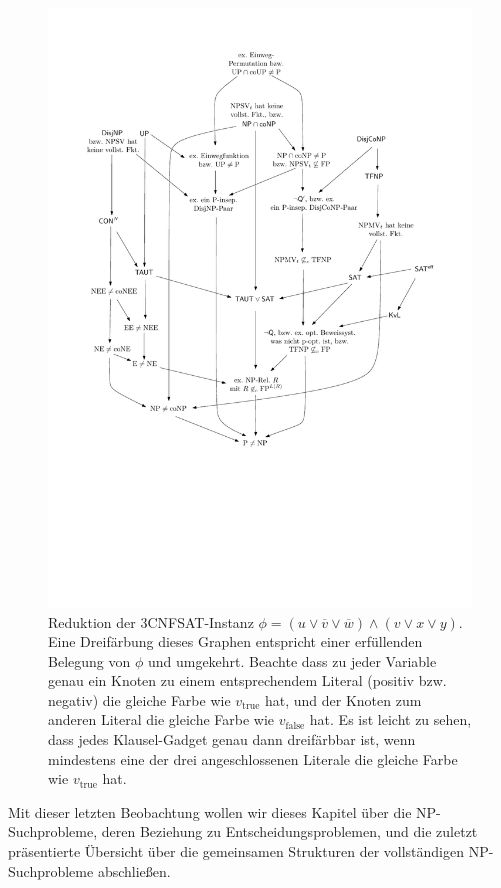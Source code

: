\begin{figure}[t]
    \begin{minipage}[t][7.9cm][t]{\textwidth}
    \centering\includegraphics[page=6]{figures.pdf}
\end{minipage}
    \caption{Reduktion der 3CNFSAT-Instanz $\phi=(u\lor \overline{v} \lor \overline{w}) \land (v\lor x\lor y)$. 
        Eine Dreifärbung dieses Graphen entspricht einer erfüllenden Belegung von $\phi$ und umgekehrt.
    Beachte dass zu jeder Variable genau ein Knoten zu einem entsprechendem Literal (positiv bzw. negativ) die gleiche Farbe wie $v_{\text{true}}$ hat, und der Knoten zum anderen Literal die gleiche Farbe wie $v_{\text{false}}$ hat. Es ist leicht zu sehen, dass jedes Klausel-Gadget genau dann dreifärbbar ist, wenn mindestens eine der drei angeschlossenen Literale die gleiche Farbe wie $v_{\text{true}}$ hat.}\label{fig:3col}
\end{figure}

Mit dieser letzten Beobachtung wollen wir dieses Kapitel über die NP-Suchprobleme, deren Beziehung zu Entscheidungsproblemen, und die zuletzt präsentierte Übersicht über die gemeinsamen Strukturen der vollständigen NP-Suchprobleme abschließen. 



